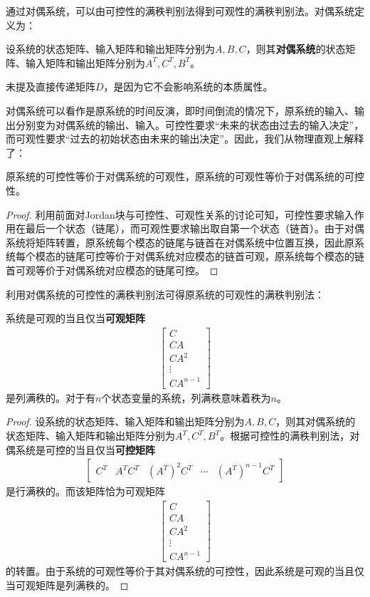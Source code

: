 \documentclass{ctexbook}
\begin{document}
通过对偶系统，可以由可控性的满秩判别法得到可观性的满秩判别法。对偶系统定义为：
\begin{definition}[对偶系统]
    设系统的状态矩阵、输入矩阵和输出矩阵分别为$A,B,C$，则其\textbf{对偶系统}的状态矩阵、输入矩阵和输出矩阵分别为$A^T,C^T,B^T$。
\end{definition}

未提及直接传递矩阵$D$，是因为它不会影响系统的本质属性。

对偶系统可以看作是原系统的时间反演，即时间倒流的情况下，原系统的输入、输出分别变为对偶系统的输出、输入。可控性要求“未来的状态由过去的输入决定”，而可观性要求“过去的初始状态由未来的输出决定”。因此，我们从物理直观上解释了：

\begin{theorem}
    原系统的可控性等价于对偶系统的可观性，原系统的可观性等价于对偶系统的可控性。
\end{theorem}
\begin{proof}
    利用前面对Jordan块与可控性、可观性关系的讨论可知，可控性要求输入作用在最后一个状态（链尾），而可观性要求输出取自第一个状态（链首）。由于对偶系统将矩阵转置，原系统每个模态的链尾与链首在对偶系统中位置互换，因此原系统每个模态的链尾可控等价于对偶系统对应模态的链首可观，原系统每个模态的链首可观等价于对偶系统对应模态的链尾可控。
\end{proof}

利用对偶系统的可控性的满秩判别法可得原系统的可观性的满秩判别法：

\begin{theorem}[可观性的满秩判别法]
    系统是可观的当且仅当\textbf{可观矩阵}
    \begin{align*}
    \begin{bmatrix}
    C\\
    CA\\
    CA^2\\
    \vdots\\
    CA^{n-1}
    \end{bmatrix}
    \end{align*}
    是列满秩的。对于有$n$个状态变量的系统，列满秩意味着秩为$n$。
\end{theorem}
\begin{proof}
    设系统的状态矩阵、输入矩阵和输出矩阵分别为$A,B,C$，则其对偶系统的状态矩阵、输入矩阵和输出矩阵分别为$A^T,C^T,B^T$。根据可控性的满秩判别法，对偶系统是可控的当且仅当\textbf{可控矩阵}
    \begin{align*}
    \begin{bmatrix}
    C^T & A^TC^T & (A^T)^2C^T & \cdots & (A^T)^{n-1}C^T
    \end{bmatrix}
    \end{align*}
    是行满秩的。而该矩阵恰为可观矩阵\begin{align*}
    \begin{bmatrix}
    C\\
    CA\\
    CA^2\\
    \vdots\\
    CA^{n-1}
    \end{bmatrix}
    \end{align*}
    的转置。由于系统的可观性等价于其对偶系统的可控性，因此系统是可观的当且仅当可观矩阵是列满秩的。
\end{proof}
\end{document}
